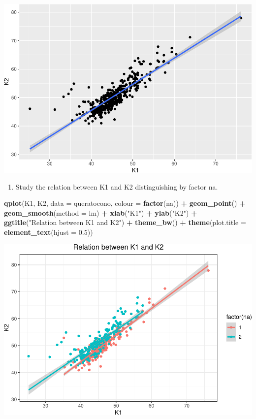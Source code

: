 \documentclass[]{article}
\newenvironment{Shaded}{\begin{snugshade}}{\end{snugshade}}
\newcommand{\DataTypeTok}[1]{\textcolor[rgb]{0.13,0.29,0.53}{#1}}
\newcommand{\FloatTok}[1]{\textcolor[rgb]{0.00,0.00,0.81}{#1}}
\newcommand{\KeywordTok}[1]{\textcolor[rgb]{0.13,0.29,0.53}{\textbf{#1}}}
\newcommand{\NormalTok}[1]{#1}
\newcommand{\OperatorTok}[1]{\textcolor[rgb]{0.81,0.36,0.00}{\textbf{#1}}}
\newcommand{\StringTok}[1]{\textcolor[rgb]{0.31,0.60,0.02}{#1}}
\providecommand{\tightlist}{%
  \setlength{\itemsep}{0pt}\setlength{\parskip}{0pt}}
\begin{document}
\includegraphics{document_files/figure-latex/unnamed-chunk-3-2.pdf}

\begin{enumerate}
\def\labelenumi{\arabic{enumi}.}
\setcounter{enumi}{1}
\tightlist
\item
  Study the relation between K1 and K2 distinguishing by factor na.
\end{enumerate}

\begin{Shaded}
\begin{Highlighting}[]
\KeywordTok{qplot}\NormalTok{(K1, K2, }\DataTypeTok{data =}\NormalTok{ queratocono, }\DataTypeTok{colour =} \KeywordTok{factor}\NormalTok{(na)) }\OperatorTok{+}
\StringTok{  }\KeywordTok{geom_point}\NormalTok{() }\OperatorTok{+}
\StringTok{  }\KeywordTok{geom_smooth}\NormalTok{(}\DataTypeTok{method =}\NormalTok{ lm) }\OperatorTok{+}
\StringTok{  }\KeywordTok{xlab}\NormalTok{(}\StringTok{"K1"}\NormalTok{) }\OperatorTok{+}\StringTok{ }\KeywordTok{ylab}\NormalTok{(}\StringTok{"K2"}\NormalTok{) }\OperatorTok{+}
\StringTok{  }\KeywordTok{ggtitle}\NormalTok{(}\StringTok{"Relation between K1 and K2"}\NormalTok{) }\OperatorTok{+}
\StringTok{  }\KeywordTok{theme_bw}\NormalTok{() }\OperatorTok{+}
\StringTok{  }\KeywordTok{theme}\NormalTok{(}\DataTypeTok{plot.title =} \KeywordTok{element_text}\NormalTok{(}\DataTypeTok{hjust =} \FloatTok{0.5}\NormalTok{))}
\end{Highlighting}
\end{Shaded}

\includegraphics{document_files/figure-latex/unnamed-chunk-4-1.pdf}
\end{document}
